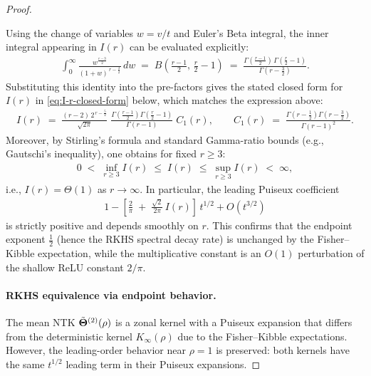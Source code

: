 \begin{proof}
\begin{remark}
Using the change of variables \( w=v/t \) and Euler's Beta integral, the inner integral appearing in \( I(r) \) can be evaluated explicitly:
\begin{align}
\int_{0}^{\infty} \frac{w^{\frac{r-3}{2}}}{(1+w)^{\,r-\frac{3}{2}}}\,dw
\;=\; B\!\left(\frac{r-1}{2},\,\frac{r}{2}-1\right)
\;=\; \frac{\Gamma\!\left(\frac{r-1}{2}\right)\,\Gamma\!\left(\frac{r}{2}-1\right)}{\Gamma\!\left(r-\frac{3}{2}\right)}.
\end{align}
Substituting this identity into the pre-factors gives the stated closed form for \( I(r) \) in \eqref{eq:I-r-closed-form} below, which matches the expression above:
\begin{align}
\label{eq:I-r-closed-form}
I(r) \;=\; \frac{(r-2)\,2^{\,r-\frac{5}{2}}}{\sqrt{2\pi}}\;
\frac{\Gamma\!\left(\frac{r-1}{2}\right)\Gamma\!\left(\frac{r}{2}-1\right)}{\Gamma(r-1)}\;
C_1(r),\qquad
C_1(r) \;=\; \frac{\Gamma\!\left(r-\tfrac{1}{2}\right)\Gamma\!\left(r-\tfrac{3}{2}\right)}{\Gamma(r-1)^2}.
\end{align}
Moreover, by Stirling's formula and standard Gamma-ratio bounds (e.g., Gautschi's inequality), one obtains for fixed \( r\ge 3 \):
\begin{align}
0 \;<\; \inf_{r\ge 3} I(r) \;\le\; I(r) \;\le\; \sup_{r\ge 3} I(r) \;<\; \infty,
\end{align}
i.e., \( I(r)=\Theta(1) \) as \( r\to\infty \). In particular, the leading Puiseux coefficient
\begin{align}
1 - \left[\frac{2}{\pi} \;+\; \frac{\sqrt{2}}{2\pi}\,I(r)\right]\,t^{1/2} + O(t^{3/2})
\end{align}
is strictly positive and depends smoothly on \( r \). This confirms that the endpoint exponent \( \tfrac{1}{2} \) (hence the RKHS spectral decay rate) is unchanged by the Fisher–Kibble expectation, while the multiplicative constant is an \( O(1) \) perturbation of the shallow ReLU constant \( 2/\pi \).
\end{remark}

\paragraph{RKHS equivalence via endpoint behavior.}
The mean NTK \( \tilde{\boldsymbol{\Theta}}^{(2)}(\rho) \) is a zonal kernel with a Puiseux expansion that differs from the deterministic kernel \( K_{\infty}(\rho) \) due to the Fisher–Kibble expectations. However, the leading-order behavior near \( \rho = 1 \) is preserved: both kernels have the same \( t^{1/2} \) leading term in their Puiseux expansions.


\end{proof}
